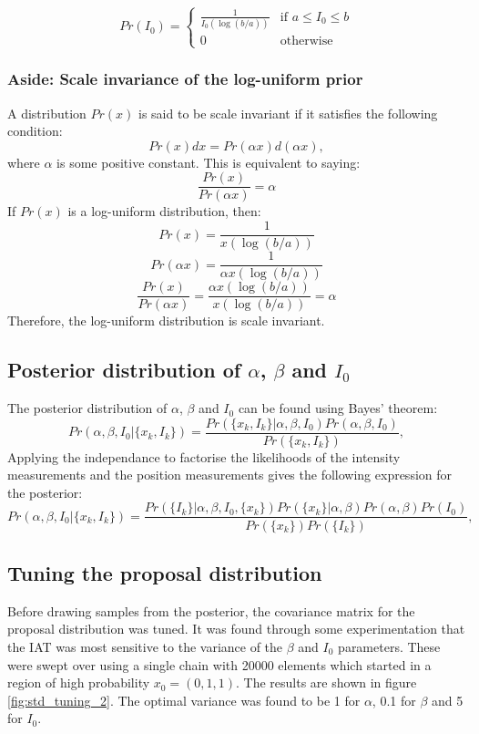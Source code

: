 \documentclass[11pt]{article}
\begin{document}
\begin{equation}
    Pr(I_0) = \left\{
        \begin{array}{ll}
            \frac{1}{I_0(\log(b/a))} & \text{if } a \leq I_0 \leq b \\
            0 & \text{otherwise}
        \end{array}
    \right.
\end{equation}

\subsubsection{Aside: Scale invariance of the log-uniform prior}
A distribution $Pr(x)$ is said to be scale invariant if it satisfies the following condition:
$$
Pr(x)dx = Pr(\alpha x) d(\alpha x),
$$ where $\alpha$ is some positive constant. This is equivalent to saying:
$$
\frac{Pr(x)}{Pr(\alpha x)} = \alpha
$$
If $Pr(x)$ is a log-uniform distribution, then:
$$
Pr(x) = \frac{1}{x(\log(b/a))}
$$
$$
Pr(\alpha x) = \frac{1}{\alpha x(\log(b/a))}
$$
$$
\frac{Pr(x)}{Pr(\alpha x)} = \frac{\alpha x(\log(b/a))}{x(\log(b/a))} = \alpha
$$
Therefore, the log-uniform distribution is scale invariant.

\subsection{Posterior distribution of $\alpha$, $\beta$ and $I_0$}

 The posterior distribution of $\alpha$, $\beta$ and $I_0$ can be found using Bayes' theorem:
\begin{equation}
    Pr(\alpha, \beta, I_0 | \{x_k, I_k\}) = \frac{Pr(\{x_k, I_k\} | \alpha, \beta, I_0) Pr(\alpha, \beta, I_0)}{Pr(\{x_k, I_k\})},
\end{equation}
Applying the independance to factorise the likelihoods of the intensity measurements and the position measurements gives the following expression for the posterior:
$$
Pr(\alpha, \beta, I_0 | \{x_k, I_k\}) = \frac{Pr(\{I_k\} | \alpha, \beta, I_0,\{x_k\})Pr(\{x_k\} | \alpha, \beta)  Pr(\alpha, \beta)Pr(I_0)}{Pr(\{x_k\})Pr(\{I_k\})},
$$


\subsection{Tuning the proposal distribution}
Before drawing samples from the posterior, the covariance matrix for the proposal distribution was tuned. It was found through some experimentation that the IAT was most sensitive to the variance of the $\beta$ and $I_0$ parameters. These were swept over using a single chain with 20000 elements which started in a region of high probability $x_0 = (0, 1, 1)$. The results are shown in figure \ref{fig:std_tuning_2}. The optimal variance was found to be 1 for $\alpha$, 0.1 for $\beta$ and 5 for $I_0$.
\end{document}
